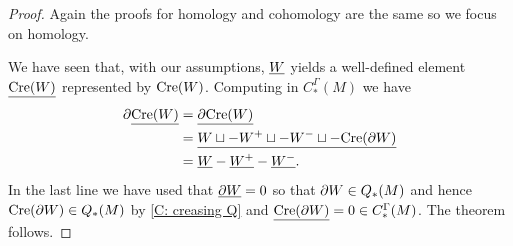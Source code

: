 \begin{proof}
	Again the proofs for homology and cohomology are the same so we focus on homology.

	We have seen that, with our assumptions, $\underline{W}$ yields a well-defined element $\underline{\mathrm{Cre}(W)}$ represented by $\mathrm{Cre}(W)$.
	Computing in $C_*^\Gamma(M)$ we have
	\begin{align*}
		\partial \underline{\mathrm{Cre}(W)}& = \underline{\partial \mathrm{Cre}(W) }\\
		& = \underline{W \sqcup -W^+ \sqcup -W^- \sqcup -\mathrm{Cre}(\partial W)}\\
		& = \underline{W} -\underline{W^+}-\underline{W^-}.
	\end{align*}
	In the last line we have used that $\underline{\partial W} = 0$ so that $\partial W \in Q_*(M)$ and hence $\mathrm{Cre}(\partial W) \in Q_*(M)$ by \cref{C: creasing Q} and $\underline{\mathrm{Cre}(\partial W)} = 0 \in C_*^\Gamma(M)$.
	The theorem follows.
\end{proof}

\begin{comment}
	Let $f \colon W \to \R$ and $p$ be a regular value of $f$.
	Define $W^+$ to be $f^{-1} [p, \infty)$ and $W^-$ to be $f^{-1} (-\infty, p]$.
	By Theorem~1 of \cite{Lipy14} (and
	also transversality as developed in in Section 6 of \cite{Joy12}), $W^+$ and $W^-$ are manifolds with corners.
	The following is Lemma~9 of \cite{Lipy14}.

	\begin{proposition}\label{P: creasing}
		Let $f \colon W \to \R$ and $p$ be a regular value of $f$.
		There is a manifold-with corners structure on the topological manifold $W \times [0,1]$, called the creasing of $W$ at $p$,
		whose boundary is the disjoint union of $W$ with its orientation
		reversed, $W^+$, $W^-$ and the creasing of ${\bd W}$ at $p$.
	\end{proposition}

	We denote the creasing of $W$ at $p$ by $\Cre(W)$, suppressing $f$ and $p$ from notation.
	See Figure~\ref{F: creasing} for a sketch of a creasing of the teardrop manifold.
\end{comment}